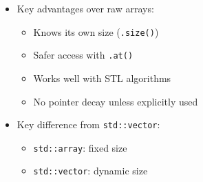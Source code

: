\documentclass[10pt]{article}
\begin{document}
\begin{itemize}
	\item Key advantages over raw arrays:
	\begin{itemize}
		\item Knows its own size (\texttt{.size()})
		\item Safer access with \texttt{.at()}
		\item Works well with STL algorithms
		\item No pointer decay unless explicitly used
	\end{itemize}

	\item Key difference from \texttt{std::vector}:
	\begin{itemize}
		\item \texttt{std::array}: fixed size
		\item \texttt{std::vector}: dynamic size
	\end{itemize}
\end{itemize}

\newpage
\end{document}
